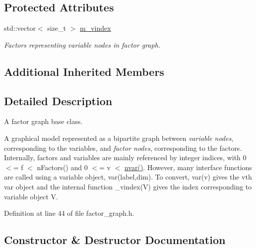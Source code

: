 \subsection*{Protected Attributes}
\begin{DoxyCompactItemize}
\item 
std\+::vector$<$ size\+\_\+t $>$ \hyperlink{classmerlin_1_1factor__graph_a0bbad915cf9b946de03f94670616cf80}{m\+\_\+vindex}\hypertarget{classmerlin_1_1factor__graph_a0bbad915cf9b946de03f94670616cf80}{}\label{classmerlin_1_1factor__graph_a0bbad915cf9b946de03f94670616cf80}

\begin{DoxyCompactList}\small\item\em Factors representing variable nodes in factor graph. \end{DoxyCompactList}\end{DoxyCompactItemize}
\subsection*{Additional Inherited Members}


\subsection{Detailed Description}
A factor graph base class. 

A graphical model represented as a bipartite graph between {\itshape variable nodes}, corresponding to the variables, and {\itshape factor nodes}, corresponding to the factors. Internally, factors and variables are mainly referenced by integer indices, with 0 $<$= f $<$ n\+Factors() and 0 $<$= v $<$ \hyperlink{classmerlin_1_1graphical__model_af70ee4f7a4414fac4f7568e3c0e5efca}{nvar()}. However, many interface functions are called using a variable object, var(label,dim). To convert, var(v) gives the vth var object and the internal function \+\_\+vindex(\+V) gives the index corresponding to variable object V. 

Definition at line 44 of file factor\+\_\+graph.\+h.



\subsection{Constructor \& Destructor Documentation}
